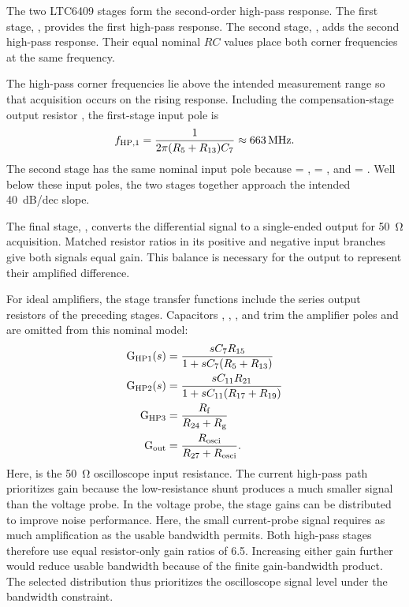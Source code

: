 The two LTC6409 stages form the second-order high-pass response.
The first stage, , provides the first high-pass response.
The second stage, , adds the second high-pass response.
Their equal nominal $RC$ values place both corner frequencies at the same frequency.

The high-pass corner frequencies lie above the intended measurement range so that acquisition occurs on the rising response.
Including the compensation-stage output resistor , the first-stage input pole is
\begin{equation}
	{f}_{\mathrm{HP,1}} = \frac{1}{2\pi ({R}_{\mathrm{5}}+{R}_{\mathrm{13}}){C}_{\mathrm{7}}} \approx \SI{663}{MHz}.
\end{equation}
The second stage has the same nominal input pole because  = ,  = , and  = .
Well below these input poles, the two stages together approach the intended \SI{+40}{dB/dec} slope.

The final stage, , converts the differential signal to a single-ended output for \SI{50}{\ohm} acquisition.
Matched resistor ratios in its positive and negative input branches give both signals equal gain.
This balance is necessary for the output to represent their amplified difference.

For ideal amplifiers, the stage transfer functions include the series output resistors of the preceding stages.
Capacitors , , , and  trim the amplifier poles and are omitted from this nominal model:
\begin{align}
	\text{G}_{\text{HP1}}(s) &= \frac{s{C}_{\mathrm{7}}{R}_{\mathrm{15}}}{1+s{C}_{\mathrm{7}}({R}_{\mathrm{5}}+{R}_{\mathrm{13}})} \\
	\text{G}_{\text{HP2}}(s) &= \frac{s{C}_{\mathrm{11}}{R}_{\mathrm{21}}}{1+s{C}_{\mathrm{11}}({R}_{\mathrm{17}}+{R}_{\mathrm{19}})} \\
	\text{G}_{\text{HP3}} &= \frac{{R}_{\mathrm{f}}}{{R}_{\mathrm{24}}+{R}_{\mathrm{g}}} \\
	\text{G}_{\text{out}} &= \frac{{R}_{\mathrm{osci}}}{{R}_{\mathrm{27}}+{R}_{\mathrm{osci}}}.
\end{align}
Here,  is the \SI{50}{\ohm} oscilloscope input resistance.
The current high-pass path prioritizes gain because the low-resistance shunt produces a much smaller signal than the voltage probe.
In the voltage probe, the stage gains can be distributed to improve noise performance.
Here, the small current-probe signal requires as much amplification as the usable bandwidth permits.
Both high-pass stages therefore use equal resistor-only gain ratios of 6.5.
Increasing either gain further would reduce usable bandwidth because of the finite gain-bandwidth product.
The selected distribution thus prioritizes the oscilloscope signal level under the bandwidth constraint.


